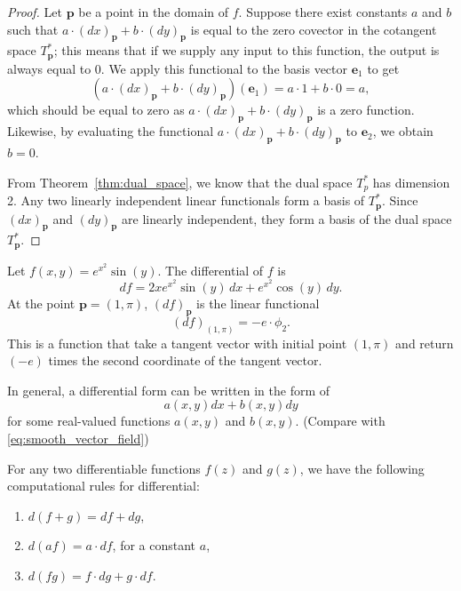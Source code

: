 \begin{proof} Let $\mathbf{p}$ be a point in the domain of $f$.
	Suppose there exist constants $a$ and $b$ such that $a\cdot (dx)_{\mathbf{p}} + b\cdot (dy)_{\mathbf{p}}$ is equal to the zero covector in the cotangent space $T_\mathbf{p}^*$; this means that if we supply any input to this function, the output is always equal to 0. We apply this functional to the basis vector $\mathbf{e}_1$ to get 
	$$
	(a\cdot (dx)_{\mathbf{p}} + b\cdot (dy)_{\mathbf{p}}) (\mathbf{e}_1) = a\cdot 1 + b\cdot 0 = a,
	$$
	which should be equal to zero as $a\cdot (dx)_{\mathbf{p}} + b\cdot (dy)_{\mathbf{p}}$ is a zero function. Likewise, by evaluating the functional $a\cdot (dx)_{\mathbf{p}} + b\cdot (dy)_{\mathbf{p}}$ to $\mathbf{e}_2$, we obtain $b=0$. 
	
	From Theorem~\ref{thm:dual_space}, we know that  the dual space $T_p^*$ has dimension 2. Any two linearly independent linear functionals form a basis of $T_\mathbf{p}^*$. Since $(dx)_{\mathbf{p}}$ and $(dy)_{\mathbf{p}}$ are linearly independent, they form a basis of the dual space $T_\mathbf{p}^*$.
\end{proof}




\begin{example}
	Let $f(x,y) = e^{x^2} \sin(y)$. The differential of $f$ is
	$$
	df = 2x e^{x^2} \sin(y)\, dx + e^{x^2} \cos(y)\, dy.
	$$
	At the point $\mathbf{p}=(1,\pi)$, $(df)_\mathbf{p}$ is the linear functional
	$$
	(df)_{(1,\pi)} = -e \cdot \phi_2.
	$$
	This is a function that take a tangent vector with initial point $(1,\pi)$ and return $(-e)$ times the second coordinate of the tangent vector.
\end{example}


In general, a differential form can be written in the form of 
\begin{equation}
a(x,y) dx + b(x,y) dy
\label{eq:differential_form}
\end{equation}
for some real-valued functions $a(x,y)$ and $b(x,y)$. (Compare with \eqref{eq:smooth_vector_field})

\begin{svgraybox}
	\begin{theorem}
\label{thm:diff_form_product_rule}
For any two differentiable functions $f(z)$ and $g(z)$, we have the following computational rules for differential:
\begin{enumerate}
	\item $d(f+g) = df + dg$,
	\item $d(af) = a \cdot df$, for a constant $a$,
	\item $d(fg) = f \cdot dg + g \cdot df$.
\end{enumerate}
	\end{theorem}
\end{svgraybox}

